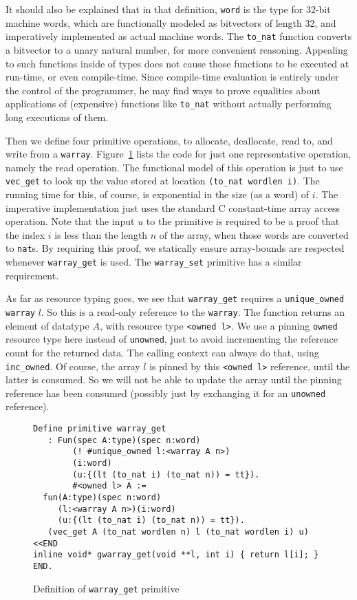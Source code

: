 \documentclass[9pt,natbib]{sigplanconf}
\begin{document}
It should also be explained that in that definition, \texttt{word} is
the type for 32-bit machine words, which are functionally modeled as
bitvectors of length 32, and imperatively implemented as actual
machine words.  The \texttt{to\_nat} function converts a bitvector to
a unary natural number, for more convenient reasoning.  Appealing to
such functions inside of types does not cause those functions to be
executed at run-time, or even compile-time.  Since compile-time
evaluation is entirely under the control of the programmer, he may
find ways to prove equalities about applications of (expensive)
functions like \texttt{to\_nat} without actually performing long
executions of them.

Then we define four primitive operations, to allocate, deallocate,
read to, and write from a \texttt{warray}.  Figure~\ref{fig:warrayget}
lists the code for just one representative operation, namely the read
operation.  The functional model of this operation is just to use
\texttt{vec\_get} to look up the value stored at location
\texttt{(to\_nat wordlen i)}.  The running time for this, of course,
is exponential in the size (as a word) of $i$.  The imperative
implementation just uses the standard C constant-time array access
operation.  Note that the input $u$ to the primitive is required to be
a proof that the index $i$ is less than the length $n$ of the array,
when those words are converted to \texttt{nat}s.  By requiring this
proof, we statically ensure array-bounds are respected whenever
\texttt{warray\_get} is used.  The \texttt{warray\_set} primitive has
a similar requirement.  

As far as resource typing goes, we see that \texttt{warray\_get}
requires a \texttt{unique\_owned} \texttt{warray} $l$.  So this is a
read-only reference to the \texttt{warray}.  The function returns an
element of datatype $A$, with resource type \texttt{<owned l>}.  We
use a pinning \texttt{owned} resource type here instead of
\texttt{unowned}, just to avoid incrementing the reference count for
the returned data.  The calling context can always do that, using
\texttt{inc\_owned}.  Of course, the array $l$ is pinned by this
\texttt{<owned l>} reference, until the latter is consumed.  So we
will not be able to update the array until the pinning reference has
been consumed (possibly just by exchanging it for an \texttt{unowned}
reference).

\begin{figure}
\small
\begin{verbatim}
Define primitive warray_get
   : Fun(spec A:type)(spec n:word)
        (! #unique_owned l:<warray A n>)
        (i:word)
        (u:{(lt (to_nat i) (to_nat n)) = tt}).
        #<owned l> A := 
  fun(A:type)(spec n:word)
     (l:<warray A n>)(i:word)
     (u:{(lt (to_nat i) (to_nat n)) = tt}). 
   (vec_get A (to_nat wordlen n) l (to_nat wordlen i) u)
<<END
inline void* gwarray_get(void **l, int i) { return l[i]; }
END.
\end{verbatim}
\caption{Definition of \texttt{warray\_get} primitive}
\label{fig:warrayget}
\end{figure}
\end{document}
